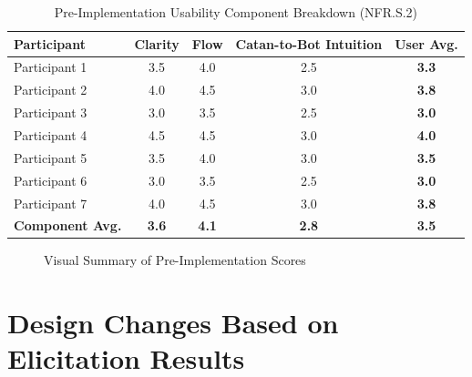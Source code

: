 \documentclass[12pt]{article}
\begin{document}
\begin{table}[H]
    \centering
    \small
    \begin{tabular}{|l|c|c|c|c|}
    \hline
    \textbf{Participant} & \textbf{Clarity} & \textbf{Flow} & \textbf{Catan-to-Bot Intuition} & \textbf{User Avg.} \\ \hline
    Participant 1 & 3.5 & 4.0 & 2.5 & \textbf{3.3} \\ \hline
    Participant 2 & 4.0 & 4.5 & 3.0 & \textbf{3.8} \\ \hline
    Participant 3 & 3.0 & 3.5 & 2.5 & \textbf{3.0} \\ \hline
    Participant 4 & 4.5 & 4.5 & 3.0 & \textbf{4.0} \\ \hline
    Participant 5 & 3.5 & 4.0 & 3.0 & \textbf{3.5} \\ \hline
    Participant 6 & 3.0 & 3.5 & 2.5 & \textbf{3.0} \\ \hline
    Participant 7 & 4.0 & 4.5 & 3.0 & \textbf{3.8} \\ \hline
    \rowcolor[HTML]{F2F2F2} 
    \textbf{Component Avg.} & \textbf{3.6} & \textbf{4.1} & \textbf{2.8} & \textbf{3.5} \\ \hline
    \end{tabular}
    \caption{Pre-Implementation Usability Component Breakdown (NFR.S.2)}\label{tab:table}
\end{table}
    
    \begin{figure}[H]
    \centering
    \caption{Visual Summary of Pre-Implementation Scores}\label{fig:figure}
    \end{figure}



\section{Design Changes Based on Elicitation Results}\label{sec:design-changes-based-on-elicitation-results}
\end{document}
